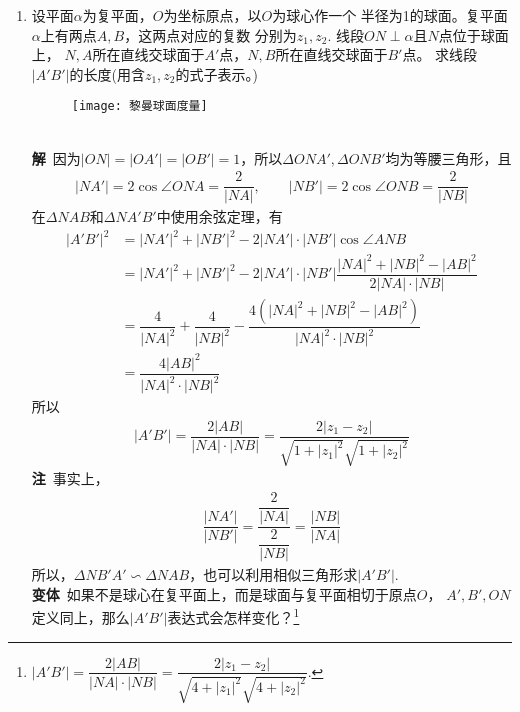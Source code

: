 \begin{enumerate}[label={【\textbf{例\thechapter.\arabic*}】},
 leftmargin=\inteval{\myenumleftmargin}pt,
 itemsep=\inteval{\myenumitempsep}pt,
 itemindent=\inteval{\myenumitemindent}pt]
\item 设平面$ \alpha $为复平面，$ O $为坐标原点，以$ O $为球心作一个
半径为1的球面。复平面$ \alpha $上有两点$ A,B $，这两点对应的复数
分别为$ z_1,z_2 $. 线段$ ON\perp\alpha $且$ N $点位于球面上，
$ N,A $所在直线交球面于$ A' $点，$ N,B $所在直线交球面于$ B' $点。
求线段$ |A'B'| $的长度(用含$ z_1,z_2 $的式子表示。) 
\begin{figure}[!ht]
    \centering
    \texttt{[image: 黎曼球面度量]}
\end{figure}
\\
\textbf{解}\ 因为$ |ON|=|OA'|=|OB'|=1 $，所以$ \Delta ONA',
\Delta ONB' $均为等腰三角形，且
\begin{align*}
    |NA'| =2\cos\angle ONA=\dfrac{2}{|NA|},\qquad
    |NB'| =2\cos\angle ONB=\dfrac{2}{|NB|} 
\end{align*}
在$ \Delta NAB $和$ \Delta NA'B' $中使用余弦定理，有
\begin{align*}
    |A'B'|^2 &=|NA'|^2+|NB'|^2-2|NA'|\cdot|NB'|\cos\angle ANB \\
    &=|NA'|^2+|NB'|^2-2|NA'|\cdot|NB'|
    \dfrac{|NA|^2+|NB|^2-|AB|^2}{2|NA|\cdot|NB|} \\
    &=\dfrac{4}{|NA|^2}+\dfrac{4}{|NB|^2}-
    \dfrac{4(|NA|^2+|NB|^2-|AB|^2)}{|NA|^2\cdot|NB|^2} \\
    &=\dfrac{4|AB|^2}{|NA|^2\cdot|NB|^2} 
\end{align*}
所以
\begin{gather*}
    |A'B'|=\dfrac{2|AB|}{|NA|\cdot|NB|}=
    \dfrac{2|z_1-z_2|}{\sqrt{1+|z_1|^2}\sqrt{1+|z_2|^2}}
\end{gather*}
\textbf{注}\ 事实上，
\begin{gather*}
    \dfrac{|NA'|}{|NB'|}=\dfrac{\dfrac{2}{|NA|}}{\dfrac{2}{|NB|}}
    =\dfrac{|NB|}{|NA|}
\end{gather*} 
所以，$ \Delta NB'A' \backsim \Delta NAB $，也可以利用相似三角形求$ |A'B'| $.\\
\textbf{变体}\ 如果不是球心在复平面上，而是球面与复平面相切于原点$ O $，
$ A',B',ON $定义同上，那么$ |A'B'| $表达式会怎样变化？\footnote{
    \q $ |A'B'|=\dfrac{2|AB|}{|NA|\cdot|NB|}=
    \dfrac{2|z_1-z_2|}{\sqrt{4+|z_1|^2}\sqrt{4+|z_2|^2}} $.  } 


\end{enumerate}
